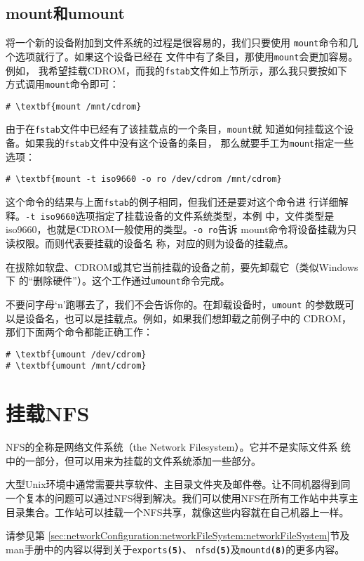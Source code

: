 \subsection{mount和umount}
\label{sec:filesystemStructure:mouting:mountAndUmount}
将一个新的设备附加到文件系统的过程是很容易的，我们只要使用
\texttt{mount}命令和几个选项就行了。如果这个设备已经在
文件中有了条目，那使用\texttt{mount}会更加容易。例如，
我希望挂载CDROM，而我的\texttt{fstab}文件如上节所示，那么我只要按如下
方式调用\texttt{mount}命令即可：
\begin{Verbatim}[frame=single,commandchars=\\\{\}]
# \textbf{mount /mnt/cdrom}
\end{Verbatim}
由于在\texttt{fstab}文件中已经有了该挂载点的一个条目，\texttt{mount}就
知道如何挂载这个设备。如果我的\texttt{fstab}文件中没有这个设备的条目，
那么就要手工为\texttt{mount}指定一些选项：
\begin{Verbatim}[frame=single,commandchars=\\\{\}]
# \textbf{mount -t iso9660 -o ro /dev/cdrom /mnt/cdrom}
\end{Verbatim}
这个命令的结果与上面\texttt{fstab}的例子相同，但我们还是要对这个命令进
行详细解释。\texttt{-t iso9660}选项指定了挂载设备的文件系统类型，本例
中，文件类型是iso9660，也就是CDROM一般使用的类型。\texttt{-o ro}告诉
mount命令将设备挂载为只读权限。而则代表要挂载的设备名
称，对应的则为设备的挂载点。

在拔除如软盘、CDROM或其它当前挂载的设备之前，要先卸载它（类似Windows下
的``删除硬件''）。这个工作通过\texttt{umount}命令完成。

不要问字母`n'跑哪去了，我们不会告诉你的。在卸载设备时，\texttt{umount}
的参数既可以是设备名，也可以是挂载点。例如，如果我们想卸载之前例子中的
CDROM，那们下面两个命令都能正确工作：
\begin{Verbatim}[frame=single,commandchars=\\\{\}]
# \textbf{umount /dev/cdrom}
# \textbf{umount /mnt/cdrom}
\end{Verbatim}

\section{挂载NFS}
\label{sec:filesystemStructure:nfsMount}
NFS的全称是网络文件系统（the Network Filesystem）。它并不是实际文件系
统中的一部分，但可以用来为挂载的文件系统添加一些部分。

大型Unix环境中通常需要共享软件、主目录文件夹及邮件卷。让不同机器得到同
一个复本的问题可以通过NFS得到解决。我们可以使用NFS在所有工作站中共享主
目录集合。工作站可以挂载一个NFS共享，就像这些内容就在自己机器上一样。

请参见第
\ref{sec:networkConfiguration:networkFileSystem:networkFileSystem}节及
man手册中的内容以得到关于\texttt{exports\textbf{(5)}}、
\texttt{nfsd\textbf{(5)}}及\texttt{mountd\textbf{(8)}}的更多内容。


